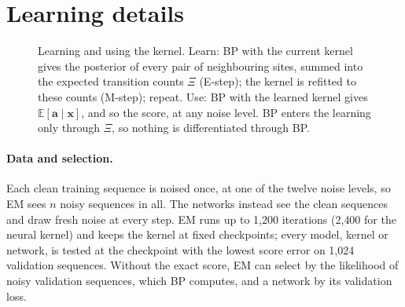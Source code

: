 \documentclass{article}
\begin{document}
\section{Learning details}
\label{app:em}

\begin{figure}[!htbp]
  \centering
  
  \caption{Learning and using the kernel. Learn: BP with the current kernel gives the posterior of every pair of
  neighbouring sites, summed into the expected transition counts $\Xi$ (E-step); the kernel is refitted to these
  counts (M-step); repeat. Use: BP with the learned kernel gives $\mathbb E[\mathbf a\mid\mathbf x]$, and so the score,
  at any noise level. BP enters the learning only through $\Xi$, so nothing is differentiated through BP.}
  \label{fig:em-loop}
\end{figure}

\paragraph{Data and selection.} Each clean training sequence is noised once, at one of the twelve noise levels, so EM
sees $n$ noisy sequences in all. The networks instead see the clean sequences and draw fresh noise at every step. EM runs
up to 1{,}200 iterations (2{,}400 for the neural kernel) and keeps the kernel at fixed checkpoints; every model, kernel or
network, is tested at the checkpoint with the lowest score error on 1{,}024 validation sequences. Without the exact
score, EM can select by the likelihood of noisy validation sequences, which BP computes, and a network by its validation
loss.
\end{document}
